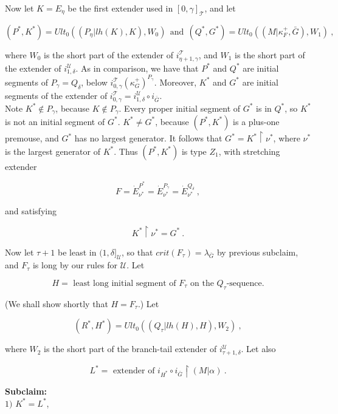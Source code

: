\documentclass[12pt]{article}
\begin{document}
Now let $K = E_\eta$ be the first extender used in $[0, \gamma]_{\mathscr{T}}$, and let

\[
(P^* , K^* ) = Ult_0 ( (P_\eta | lh(K) , K), W_0) \ \ \text{and} \ \ (Q^* , G^* ) = Ult_0 ( (M | \kappa_F^+ , \bar{G} ) , W_1 ) \ ,
\]

where $W_0$ is the short part of the extender of $i_{\eta + 1 , \gamma}^{\mathscr{T}}$, and $W_1$ is the short part of the extender of $i_{1, \delta}^{\mathscr{U}}$.  As in comparison, we have that $P^*$ and $Q^*$ are initial segments of $P_\gamma = Q_\delta$, below $i_{0, \gamma}^{\mathscr{T}} (\kappa_G^+)^{P_\gamma}$.  Moreover, $K^*$ and $G^*$ are initial segments of the extender of $i_{0, \gamma}^{\mathscr{T}} = i_{1, \delta}^{\mathscr{U}} \circ i_{\bar{G}}$.\\

Note $K^* \notin P_\gamma$, because $K \notin P_\gamma$.  Every proper initial segment of $G^*$ is in $Q^*$, so $K^*$ is not an initial segment of $G^*$.  $K^* \neq G^*$, because $(P^* , K^* )$ is a plus-one premouse, and $G^*$ has no largest generator.  It follows that $G^* = K^* \restriction \nu^*$, where $\nu^*$ is the largest generator of $K^*$.  Thus $(P^* , K^*)$ is type $Z_1$, with stretching extender

\[
F = \dot{E}_{\nu^*}^{P^*} = \dot{E}_{\nu^*}^{P_\gamma} = \dot{E}_{\nu^*}^{Q_\delta} \ ,
\]

and satisfying

\[
K^* \restriction \nu^* = G^* \ .
\]

Now let $\tau + 1$ be least in $( 1, \delta ]_{\mathscr{U}}$, so that $crit (F_\tau) = \lambda_{\bar{G}}$ by previous subclaim, and $F_\tau$ is long by our rules for $\mathscr{U}$.  Let

\[
H = \text{ least long initial segment of $F_\tau$ on the $Q_\tau$-sequence.}
\]

(We shall show shortly that $H = F_\tau$.)  Let

\[
(R^* , H^* ) = Ult_0 (( Q_\tau | lh (H) , H) , W_2) \ ,
\]

where $W_2$ is the short part of the branch-tail extender of $i_{\tau+ 1 , \delta}^{\mathscr{U}}$.  Let also

\[
L^* = \text{ extender of } i_{H^*} \circ i_{\bar{G}} \restriction (M | \alpha ) \ .
\]

\textbf{Subclaim:}\\

\indent \indent $1)$ $K^* = L^*$,\\
\end{document}
